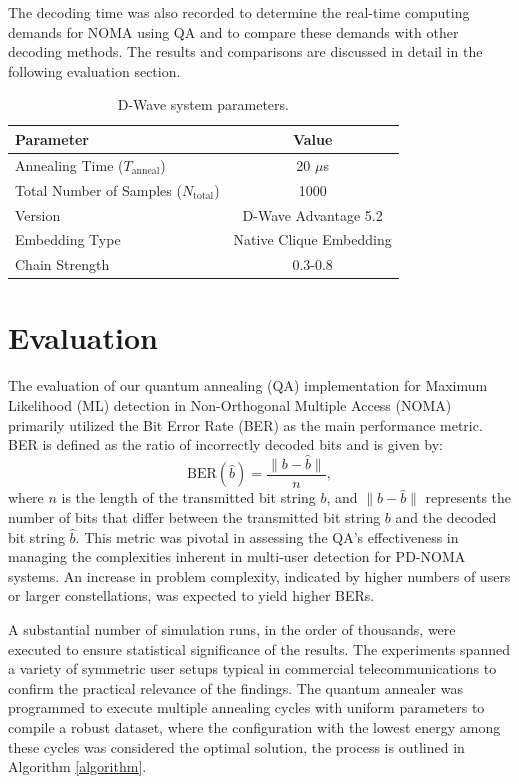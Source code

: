 The decoding time was also recorded to determine the real-time computing demands for NOMA using QA and to compare these demands with other decoding methods. The results and comparisons are discussed in detail in the following evaluation section.
\begin{table}
\caption{D-Wave system parameters.}
\centering
\label{table:dwave_parameters}
\begin{tabular}{l c}
\hline
\textbf{Parameter} & \textbf{Value} \\
\hline
Annealing Time (\(T_{\text{anneal}}\)) & 20 $\mu$s \\
Total Number of Samples (\(N_{\text{total}}\)) & 1000 \\
Version & D-Wave Advantage 5.2 \\
Embedding Type & Native Clique Embedding \\
Chain Strength & 0.3-0.8 \\
\hline
\end{tabular}
\end{table}
\section{Evaluation}

The evaluation of our quantum annealing (QA) implementation for Maximum Likelihood (ML) detection in Non-Orthogonal Multiple Access (NOMA) primarily utilized the Bit Error Rate (BER) as the main performance metric. BER is defined as the ratio of incorrectly decoded bits and is given by:
\begin{equation}
\text{BER}(\hat{b}) = \frac{\|b-\hat{b}\|}{n},
\end{equation}
where \( n \) is the length of the transmitted bit string \( b \), and \( \|b-\hat{b}\| \) represents the number of bits that differ between the transmitted bit string \( b \) and the decoded bit string \( \hat{b} \). This metric was pivotal in assessing the QA's effectiveness in managing the complexities inherent in multi-user detection for PD-NOMA systems. An increase in problem complexity, indicated by higher numbers of users or larger constellations, was expected to yield higher BERs.

A substantial number of simulation runs, in the order of thousands, were executed to ensure statistical significance of the results. The experiments spanned a variety of symmetric user setups typical in commercial telecommunications to confirm the practical relevance of the findings. The quantum annealer was programmed to execute multiple annealing cycles with uniform parameters to compile a robust dataset, where the configuration with the lowest energy among these cycles was considered the optimal solution, the process is outlined in Algorithm \autoref{algorithm}.

